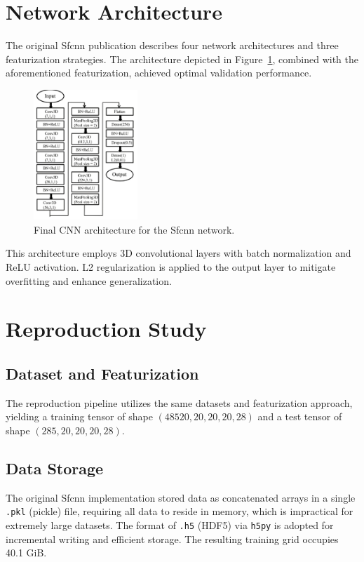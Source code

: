\documentclass[unnumsec,webpdf,contemporary,large]{oup-authoring-template}
\theoremstyle{thmstyleone}%
\theoremstyle{thmstyletwo}%
\theoremstyle{thmstylethree}%
\begin{document}
\section{Network Architecture}

The original Sfcnn publication describes four network architectures and three featurization strategies. The architecture depicted in Figure~\ref{fig:CNN}, combined with the aforementioned featurization, achieved optimal validation performance.

\begin{figure}[H]
    \centering
    \includegraphics[width=0.35\textwidth]{images/CNN.png}
    \caption{Final CNN architecture for the Sfcnn network.}
    \label{fig:CNN}
\end{figure}

This architecture employs 3D convolutional layers with batch normalization and ReLU activation. L2 regularization is applied to the output layer to mitigate overfitting and enhance generalization.

\section{Reproduction Study}

\subsection{Dataset and Featurization}
\vspace{0.5em}
The reproduction pipeline utilizes the same datasets and featurization approach, yielding a training tensor of shape $(48520, 20, 20, 20, 28)$ and a test tensor of shape $(285, 20, 20, 20, 28)$.

\subsection{Data Storage}
\vspace{0.5em}
The original Sfcnn implementation stored data as concatenated arrays in a single \texttt{.pkl} (pickle) file, requiring all data to reside in memory, which is impractical for extremely large datasets. The format of \texttt{.h5} (HDF5) via \texttt{h5py} is adopted for incremental writing and efficient storage. The resulting training grid occupies 40.1 GiB.
\end{document}
